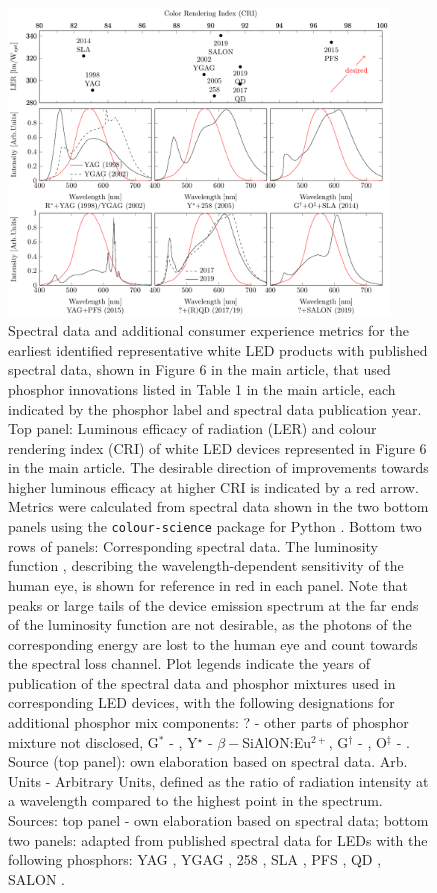 \documentclass[parskip=full]{article}
\begin{document}
\begin{figure}[H]
	\centering
    \includegraphics[width=0.9\textwidth]{./figures/phosphor_spectrum-comparison.pdf}
	\caption{Spectral data and additional consumer experience metrics for the earliest identified representative white LED products with published spectral data, shown in Figure 6 in the main article, that used phosphor innovations listed in Table 1 in the main article, each indicated by the phosphor label and spectral data publication year. Top panel: Luminous efficacy of radiation (LER) and colour rendering index (CRI) of white LED devices represented in Figure 6 in the main article. The desirable direction of improvements towards higher luminous efficacy at higher CRI is indicated by a red arrow. Metrics were calculated from spectral data shown in the two bottom panels using the \texttt{colour-science} package for Python \cite{colour-science_software}. Bottom two rows of panels: Corresponding spectral data. The luminosity function \cite{cie-term-lumeff}, describing the wavelength-dependent sensitivity of the human eye, is shown for reference in red in each panel. Note that peaks or large tails of the device emission spectrum at the far ends of the luminosity function are not desirable, as the photons of the corresponding energy are lost to the human eye and count towards the spectral loss channel. Plot legends indicate the years of publication of the spectral data and phosphor mixtures used in corresponding LED devices, with the following designations for additional phosphor mix components: ? -  other parts of phosphor mixture not disclosed, G$^*$ - , Y$^\star$ - $\beta-$SiAlON:Eu$^{2+}$, G$^\dagger$ - , O$^\ddagger$ - . Source (top panel): own elaboration based on spectral data. Arb. Units - Arbitrary Units, defined as the ratio of radiation intensity at a wavelength compared to the highest point in the spectrum. Sources: top panel - own elaboration based on spectral data; bottom two panels: adapted from published spectral data for LEDs with the following phosphors: YAG \cite{bando1998development}, YGAG \cite{Mueller2002}, 258 \cite{MuellerMach2005}, SLA \cite{Pust2014}, PFS \cite{trigain_spectrum}, QD \cite{lumileds2016qd}\cite{osram2019qd}, SALON \cite{Hoerder2019}.}
\label{fig:phosphor_spectrum}
\end{figure}
\end{document}
